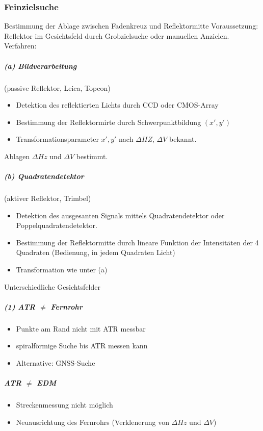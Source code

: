 \documentclass[12pt]{article}
\begin{document}
\subsubsection{Feinzielsuche}
Bestimmung der Ablage zwischen Fadenkreuz und Reflektormitte\newline
Voraussetzung: Reflektor im Gesichtsfeld durch Grobzielsuche oder manuellen Anzielen.  Verfahren:
\subparagraph{(a) Bildverarbeitung}
(passive Reflektor, Leica, Topcon)
\begin{itemize}
	\item Detektion des reflektierten Lichts durch CCD oder CMOS-Array
	\item Bestimmung der Reflektormirte durch Schwerpunktbildung $(x', y')$
	\item Transformationsparameter $x',y'$ nach $\Delta HZ$, $\Delta V$ bekannt.
\end{itemize}
	Ablagen $\Delta Hz$ und $\Delta V$ bestimmt.
\subparagraph{(b) Quadratendetektor}
(aktiver Reflektor, Trimbel)
\begin{itemize}
	\item Detektion des ausgesanten Signals mittels Quadratendetektor oder Poppelquadratendetektor.
	\item Bestimmung der Reflektormitte durch lineare Funktion der Intensitäten der 4 Quadraten (Bedienung, in jedem Quadraten Licht)
	\item Transformation wie unter (a)
\end{itemize}
Unterschiedliche Gesichtsfelder
\subparagraph{(1) ATR $\neq$ Fernrohr}
\begin{itemize}
	\item Punkte am Rand nicht mit ATR messbar
	\item spiralförmige Suche bis ATR messen kann
	\item Alternative: GNSS-Suche
\end{itemize}
\subparagraph{ATR $\neq$ EDM}
\begin{itemize}
	\item Streckenmessung nicht möglich
	\item Neuausrichtung des Fernrohrs (Verklenerung von $\Delta Hz$ und $\Delta V$)
\end{itemize}
\end{document}
